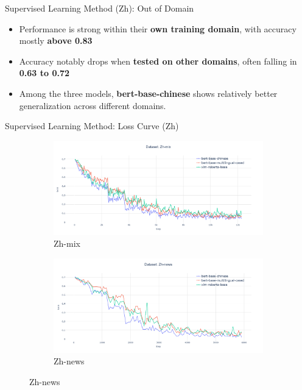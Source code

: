 \documentclass[serif]{beamer}
\begin{document}
\begin{frame}{Supervised Learning Method (Zh): Out of Domain}
\begin{itemize}
    \item Performance is strong within their \textbf{own training domain}, with accuracy mostly \textbf{above 0.83}
    \item Accuracy notably drops when \textbf{tested on other domains}, often falling in \textbf{0.63 to 0.72}
    \item Among the three models, \textbf{bert-base-chinese} shows relatively better generalization across different domains.
\end{itemize}
\end{frame}

\begin{frame}{Supervised Learning Method: Loss Curve (Zh)}
\begin{figure}[htbp]
    \centering
    \begin{subfigure}[b]{0.44\linewidth}
        \centering
        \includegraphics[width=\linewidth]{images/zh-mix.png}
        \caption{Zh-mix}
        \label{fig:en-mix}
    \end{subfigure}
    \hfill
    \begin{subfigure}[b]{0.44\linewidth}
        \centering
        \includegraphics[width=\linewidth]{images/zh-news.png}
        \caption{Zh-news}
        \label{fig:en-essay}
    \end{subfigure}


\end{figure}
\end{frame}
\end{document}
